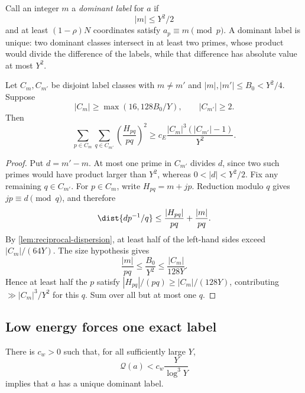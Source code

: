 Call an integer $m$ a \emph{dominant label} for $a$ if
\[
 |m|\leq Y^2/2
\]
and at least $(1-\rho)N$ coordinates satisfy $a_p\equiv m\pmod p$.  A dominant label is unique: two dominant classes intersect in at least two primes, whose product would divide the difference of the labels, while that difference has absolute value at most $Y^2$.

\begin{lemma}
\label{lem:cross-label-energy}
Let $C_m,C_{m'}$ be disjoint label classes with $m\neq m'$ and $|m|,|m'|\leq B_0<Y^2/4$.  Suppose
\[
 |C_m|\geq\max(16,128B_0/Y),
 \qquad
 |C_{m'}|\geq2.
\]
Then
\[
 \sum_{p\in C_m}\sum_{q\in C_{m'}}
 \left(\frac{H_{pq}}{pq}\right)^2
 \geq c_E\frac{|C_m|^3(|C_{m'}|-1)}{Y^2}.
\]
\end{lemma}

\begin{proof}
Put $d=m'-m$.  At most one prime in $C_{m'}$ divides $d$, since two such primes would have product larger than $Y^2$, whereas $0<|d|<Y^2/2$.  Fix any remaining $q\in C_{m'}$.  For $p\in C_m$, write $H_{pq}=m+jp$.  Reduction modulo $q$ gives $jp\equiv d\pmod q$, and therefore
\[
 \dist{dp^{-1}/q}
 \leq\frac{|H_{pq}|}{pq}+\frac{|m|}{pq}.
\]
By \cref{lem:reciprocal-dispersion}, at least half of the left-hand sides exceed $|C_m|/(64Y)$.  The size hypothesis gives
\[
 \frac{|m|}{pq}\leq\frac{B_0}{Y^2}
 \leq\frac{|C_m|}{128Y}.
\]
Hence at least half the $p$ satisfy $|H_{pq}|/(pq)\geq |C_m|/(128Y)$, contributing $\gg |C_m|^3/Y^2$ for this $q$.  Sum over all but at most one $q$.
\end{proof}

\subsection{Low energy forces one exact label}

\begin{proposition}
\label{prop:nondominant-forcing}
There is $c_w>0$ such that, for all sufficiently large $Y$,
\[
 \mathcal Q(a)<c_w\frac{Y}{\log^3Y}
\]
implies that $a$ has a unique dominant label.
\end{proposition}

